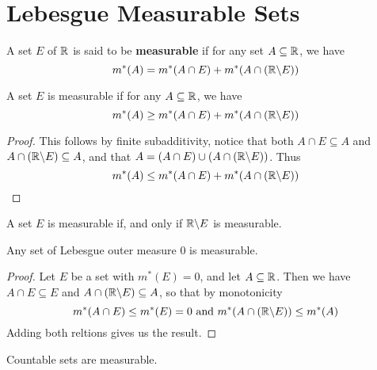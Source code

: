\section{Lebesgue Measurable Sets}

\begin{definition}
    A set $E$ of  $\mathbb{R}$ is said to be  \textbf{measurable} if for any set $A
    \subseteq \mathbb{R}$, we have
    \begin{equation*}
        m^\ast(A)=m^\ast(A \cap E)+m^\ast(A \cap (\mathbb{R} \backslash E))
    \end{equation*}
\end{definition}

\begin{lemma}\label{8.3.1}
    A set $E$ is measurable if for any $A \subseteq \mathbb{R}$, we have
    \begin{equation*}
        m^\ast(A) \geq m^\ast(A \cap E)+m^\ast(A \cap (\mathbb{R} \backslash E))
    \end{equation*}
\end{lemma}
\begin{proof}
    This follows by finite subadditivity, notice that both $A \cap E \subseteq
    A$ and $A \cap (\mathbb{R} \backslash E) \subseteq A$, and that $A=(A \cap E) \cup (A
    \cap (\mathbb{R} \backslash E))$. Thus
    \begin{equation*}
        m^\ast(A) \leq m^\ast(A \cap E)+m^\ast(A \cap (\mathbb{R} \backslash E))
    \end{equation*}
\end{proof}
\begin{corollary}
    A set $E$ is measurable if, and only if  $\mathbb{R} \backslash E$ is measurable.
\end{corollary}

\begin{lemma}\label{8.3.2}
    Any set of Lebesgue outer measure $0$ is measurable.
\end{lemma}
\begin{proof}
    Let $E$ be a set with  $m^\ast(E)=0$, and let $A \subseteq \mathbb{R}$. Then we have
     $A \cap E \subseteq E$ and  $A \cap (\mathbb{R} \backslash E) \subseteq A$, so that by
     monotonicity
     \begin{equation*}
         m^\ast(A \cap E) \leq m^\ast(E)=0 \text{ and }
         m^\ast(A \cap (\mathbb{R} \backslash E)) \leq m^\ast(A)
     \end{equation*}
     Adding both reltions gives us the result.
\end{proof}
\begin{corollary}
    Countable sets are measurable.
\end{corollary}


